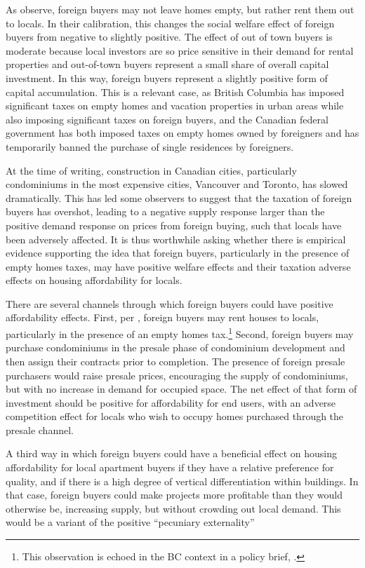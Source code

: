 \documentclass[12pt]{article}
\begin{document}
As \textcite{favilukisVanNieuwerburgh} observe, foreign buyers may not leave
homes empty, but rather rent them out to locals. In their calibration, this
changes the social welfare effect of foreign buyers from negative to slightly
positive. The effect of out of town buyers is moderate because local investors
are so price sensitive in their demand for rental properties and out-of-town
buyers represent a small share of overall capital investment. In this way,
foreign buyers represent a slightly positive form of capital accumulation. This
is a relevant case, as British Columbia has imposed significant taxes on empty
homes and vacation properties in urban areas while also imposing significant
taxes on foreign buyers, and the Canadian federal government has both imposed
taxes on empty homes owned by foreigners and has temporarily banned the
purchase of single residences by foreigners.

At the time of writing, construction in Canadian cities, particularly
condominiums in the most expensive cities, Vancouver and Toronto, has slowed
dramatically. This has led some observers to suggest that the taxation of
foreign buyers has overshot, leading to a negative supply response larger than
the positive demand response on prices from foreign buying, such that locals
have been adversely affected. It is thus worthwhile asking whether there is
empirical evidence supporting the idea that foreign buyers, particularly in the
presence of empty homes taxes, may have positive welfare effects and their
taxation adverse effects on housing affordability for locals.

There are several channels through which foreign buyers could have positive
affordability effects. First, per \textcite{favilukisVanNieuwerburgh}, foreign
buyers may rent houses to locals, particularly in the presence of an empty
homes tax.\footnote{This observation is echoed in the BC context in a policy
brief, \textcite{Goodman}.} Second, foreign buyers may purchase condominiums in
the presale phase of condominium development and then assign their contracts
prior to completion. The presence of foreign presale purchasers would raise
presale prices, encouraging the supply of condominiums, but with no increase in
demand for occupied space. The net effect of that form of investment should be
positive for affordability for end users, with an adverse competition effect
for locals who wish to occupy homes purchased through the presale channel.

A third way in which foreign buyers could have a beneficial effect on
housing affordability for local apartment buyers if they have a relative
preference for quality, and if there is a high degree of vertical
differentiation within buildings. In that case, foreign buyers could make
projects more profitable than they would otherwise be, increasing supply, but
without crowding out local demand. This would be a variant of the positive
``pecuniary externality''
\end{document}
